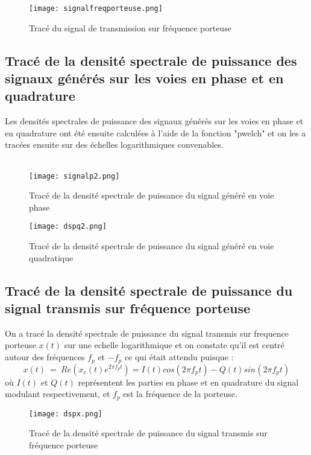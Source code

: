 \documentclass[11pt]{article}
\begin{document}
\begin{figure}[ht!]
    \centering
    \texttt{[image: signalfreqporteuse.png]}
    \caption{Tracé du signal de transmission sur fréquence porteuse \label{fig : SignalFreqPorteuse}}
\end{figure}

\newpage
\subsection{Tracé de la densité spectrale de puissance des signaux générés sur les voies en phase et en quadrature}
Les densités spectrales de puissance des signaux générés sur les voies en phase et en quadrature ont été ensuite calculées à l'aide de la fonction "pwelch" et on les a tracées ensuite sur des échelles logarithmiques convenables.\\\\

\begin{figure}[ht!]
    \centering
    \texttt{[image: signalp2.png]}
    \caption{Tracé de la densité spectrale de puissance du signal généré en voie phase  \label{fig : DspPhase}}
\end{figure}

\begin{figure}[ht!]
    \centering
    \texttt{[image: dspq2.png]}
    \caption{Tracé de la densité spectrale de puissance du signal généré en voie quadratique  \label{fig : DspQuadratique}}
\end{figure}

\subsection{Tracé de la densité spectrale de puissance du signal transmis sur fréquence porteuse}
On a tracé la densité spectrale de puissance du signal transmis sur frequence porteuse $x(t)$ sur une echelle logarithmique et on constate qu'il est centré autour des fréquences $f_p$ et $-f_p$ ce qui était attendu puisque :
$$x(t) \ = \ Re(x_e(t)e^{2\pi f_pt}) = I(t)cos(2\pi f_pt) - Q(t)sin(2\pi f_pt)$$
où $I(t)$ et $Q(t)$ représentent les parties en phase et en quadrature du signal modulant respectivement, et $f_p$ est la fréquence de la porteuse.

\begin{figure}[ht!]
    \centering
    \texttt{[image: dspx.png]}
    \caption{Tracé de la densité spectrale de puissance du signal transmis sur fréquence porteuse  \label{fig : DspFreqPorteuse}}
\end{figure}
\end{document}
